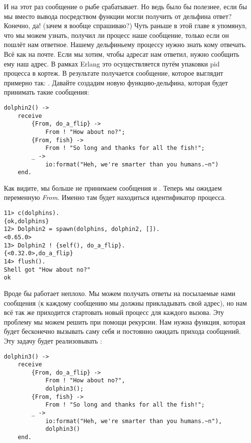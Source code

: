 И на этот раз сообщение о рыбе срабатывает.
Но ведь было бы полезнее, если бы мы вместо вывода посредством функции  могли получить от дельфина ответ?
Конечно, да! (зачем я вообще спрашиваю?)
Чуть раньше в этой главе я упомянул, что мы можем узнать, получил ли процесс наше сообщение, только если он пошлёт нам ответное.
Нашему дельфиньему процессу нужно знать кому отвечать.
Всё как на почте.
Если мы хотим, чтобы адресат нам ответил, нужно сообщить ему наш адрес.
В рамках Erlang это осуществляется путём упаковки pid процесса в кортеж.
В результате получается сообщение, которое выглядит примерно так: .
Давайте создадим новую функцию\--дельфина, которая будет принимать такие сообщения:
\begin{lstlisting}[style=erlang]
dolphin2() ->
    receive
        {From, do_a_flip} ->
            From ! "How about no?";
        {From, fish} ->
            From ! "So long and thanks for all the fish!";
        _ ->
            io:format("Heh, we're smarter than you humans.~n")
    end.
\end{lstlisting}

Как видите, мы больше не принимаем сообщения   и . Теперь мы ожидаем переменную \emph{From}.
Именно там будет находиться идентификатор процесса.
\begin{lstlisting}[style=erlang]
11> c(dolphins).
{ok,dolphins}
12> Dolphin2 = spawn(dolphins, dolphin2, []).
<0.65.0>
13> Dolphin2 ! {self(), do_a_flip}.         
{<0.32.0>,do_a_flip}
14> flush().
Shell got "How about no?"
ok
\end{lstlisting}

Вроде бы работает неплохо.
Мы можем получать ответы на посылаемые нами сообщения (к каждому сообщению мы должны прикладывать свой адрес), но нам всё так же приходится стартовать новый процесс для каждого вызова.
Эту проблему мы можем решить при помощи рекурсии.
Нам нужна функция, которая будет бесконечно вызывать саму себя и постоянно ожидать прихода сообщений.
Эту задачу будет реализовывать :
\begin{lstlisting}[style=erlang]
dolphin3() ->
    receive
        {From, do_a_flip} ->
            From ! "How about no?",
            dolphin3();
        {From, fish} ->
            From ! "So long and thanks for all the fish!";
        _ ->
            io:format("Heh, we're smarter than you humans.~n"),
            dolphin3()
    end.
\end{lstlisting}

